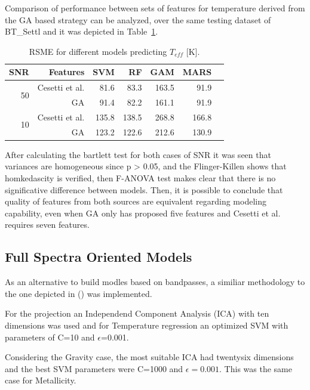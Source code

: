 



Comparison of performance between sets of features for temperature 
derived from the GA based strategy can be analyzed, 
over the same testing dataset of BT\_Settl and it was depicted 
in Table~\ref{tab:model_TSD}.

\begin{table}
\begin{center}
\begin{tabular}{rrrrrrr}
  \hline
  SNR & Features & SVM & RF & GAM  & MARS  \\
  \hline
  \multirow{2}{*}{50}  &  Cesetti et al. & 81.6 &  83.3 & 163.5 & 91.9 \\
      &  GA             & 91.4 & 82.2 & 161.1  & 91.9  \\
  \multirow{2}{*}{10}  &  Cesetti et al. & 135.8 & 138.5 & 268.8 & 166.8  \\
      &  GA             & 123.2 & 122.6 & 212.6 & 130.9  \\
   \hline
\end{tabular}
\caption { RSME for different models predicting $T_{eff}$ [K].} 
\label{tab:model_TSD} 
\end{center}
\end{table}

After calculating the bartlett test for both cases of SNR it was 
seen that variances are homogeneous since p > 0.05, and 
the Flinger-Killen shows that homkedascity is verified, 
then F-ANOVA test makes clear that there is no significative 
difference between models. Then, it is possible to conclude
that quality of features from both sources are equivalent
regarding modeling capability, even when GA only has proposed five
features and Cesetti et al. requires seven features.



\subsection{Full Spectra Oriented Models}
\label {ssub:GM_BPG}

As an alternative to build modles based on bandpasses, 
a similiar methodology to the one depicted in (\cite{2013A&A...550A.120S})
was implemented.

For the projection an Independend Component Analysis (ICA) with ten dimensions
was used and for Temperature regression an optimized SVM 
with parameters of C=10 and $\epsilon$=0.001.

Considering the Gravity case, the most suitable ICA had twentysix dimensions and the 
best SVM parameters were C=1000 and $\epsilon = 0.001 $. This was the same case
for Metallicity.

